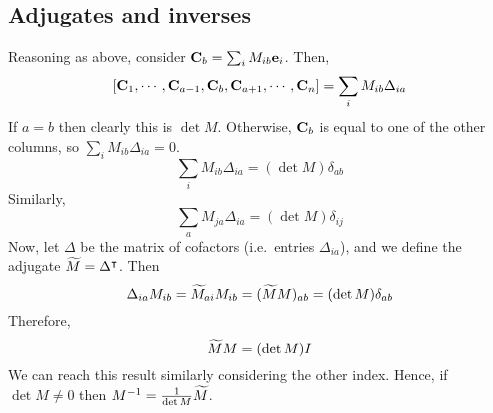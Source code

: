 \subsection{Adjugates and inverses}
Reasoning as above, consider \(\vb C_b = \sum_i M_{ib} \vb e_i\).
Then,
\[
	[\vb C_1, \cdots, \vb C_{a-1}, \vb C_b, \vb C_{a+1}, \cdots, \vb C_n ] = \sum_i M_{ib} \Delta_{ia}
\]
If \(a=b\) then clearly this is \(\det M\).
Otherwise, \(\vb C_b\) is equal to one of the other columns, so \(\sum_i M_{ib} \Delta_{ia} = 0\).
\[
	\sum_i M_{ib} \Delta_{ia} = (\det M)\delta_{ab}
\]
Similarly,
\[
	\sum_a M_{ja} \Delta_{ia} = (\det M)\delta_{ij}
\]
Now, let \(\Delta\) be the matrix of cofactors (i.e.\ entries \(\Delta_{ia}\)), and we define the adjugate \(\widetilde{M} = \Delta^\intercal\).
Then
\[
	\Delta_{ia}M_{ib} = \widetilde{M}_{ai}M_{ib} = (\widetilde{M} M)_{ab} = (\det M)\delta_{ab}
\]
Therefore,
\[
	\widetilde{M} M = (\det M) I
\]
We can reach this result similarly considering the other index.
Hence, if \(\det M \neq 0\) then \(M^{-1} = \frac{1}{\det M}\widetilde{M}\).
